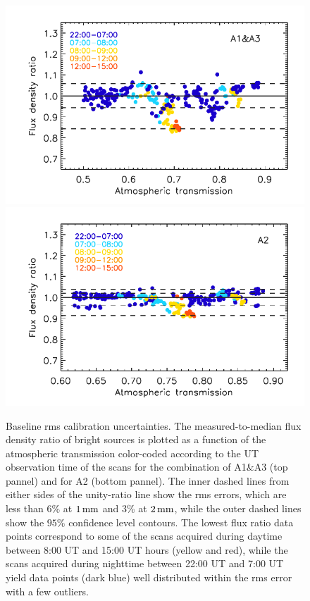 \begin{figure}[!thbp]
  \begin{center}
      \includegraphics[clip=true, trim={0.9cm, 0, 0.5cm, 0.6cm},width=0.75\linewidth]{Figures/plot_flux_density_ratio_obstau_allbright_obsdate_corrected_skydip_rescaled_1mm.pdf}
     \includegraphics[clip=true, trim={0.9cm, 0, 0.5cm, 0.6cm},width=0.75\linewidth]{Figures/plot_flux_density_ratio_obstau_allbright_obsdate_corrected_skydip_rescaled_a2.pdf} 
    \caption[Baseline calibration rms error estimate]{Baseline
      rms calibration uncertainties. The
      measured-to-median flux density ratio of bright sources is
      plotted as a function of the atmospheric transmission
      color-coded according to the UT
      observation time of the scans for the combination of A1$\&$A3
      (top pannel)
      and for A2 (bottom pannel).
      The inner dashed lines from either sides of the
      unity-ratio line show the rms errors, {\lp which
      are less than 6\% at $1\,\rm{mm}$ and 3\% at $2\,\rm{mm}$, while
      the outer dashed lines show the $95\%$ confidence level contours.}
      The lowest flux ratio data points correspond to some of the
      scans acquired during daytime between 8:00 UT and 15:00 UT
      hours (yellow and red), while the scans acquired during nighttime
      between 22:00 UT and 7:00 UT yield data points (dark blue)
      well distributed within the rms error with a few outliers.}
    \label{fig:allbright_rms_corrected_skydip}
  \end{center}
\end{figure}
